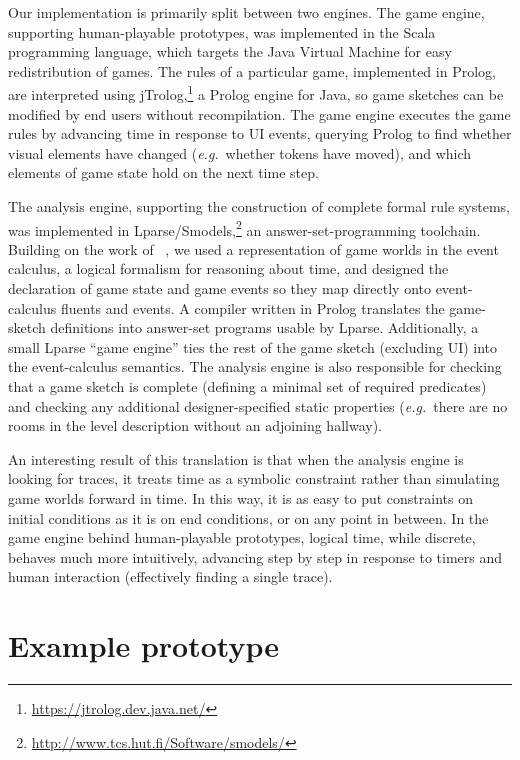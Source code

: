 \documentclass[letterpaper]{article}
\newcommand{\citenoun}[1]{\citeauthor{#1}~\shortcite{#1}}
\begin{document}
Our implementation is primarily split between two engines. The game engine,
supporting human-playable prototypes, was implemented in the Scala programming
language, which targets the Java Virtual Machine for easy redistribution of
games. The rules of a particular game, implemented in Prolog, are interpreted
using jTrolog,\footnote{\url{https://jtrolog.dev.java.net/}} a Prolog engine
for Java, so game sketches can be modified by end users without recompilation.
The game engine executes the game rules by advancing time in response to UI
events, querying Prolog to find whether visual elements have changed
(\emph{e.g.}\ whether tokens have moved), and which elements of game state hold
on the next time step.

The analysis engine, supporting the construction of complete formal rule
systems, was implemented in
Lparse/Smodels,\footnote{\url{http://www.tcs.hut.fi/Software/smodels/}} an
answer-set-programming toolchain. Building on the work of
\citenoun{NelsonMateas:AIIDE08}, we used a representation of game worlds in the
event calculus, a logical formalism for reasoning about time, and designed the
declaration of game state and game events so they map directly onto
event-calculus fluents and events. A compiler written in Prolog translates the
game-sketch definitions into answer-set programs usable by Lparse. Additionally,
a small Lparse ``game engine'' ties the rest of the game sketch (excluding UI)
into the event-calculus semantics.  The analysis engine is also responsible for
checking that a game sketch is complete (defining a minimal set of required
predicates) and checking any additional designer-specified static properties
(\emph{e.g.}\ there are no rooms in the level description without an adjoining
hallway).

An interesting result of this translation is that when the analysis engine is
looking for traces, it treats time as a symbolic constraint rather than
simulating game worlds forward in time. In this way, it is as easy to put
constraints on initial conditions as it is on end conditions, or on any point
in between. In the game engine behind human-playable prototypes, logical time,
while discrete, behaves much more intuitively, advancing step by step in
response to timers and human interaction (effectively finding a single trace).

\section{Example prototype}
\end{document}

